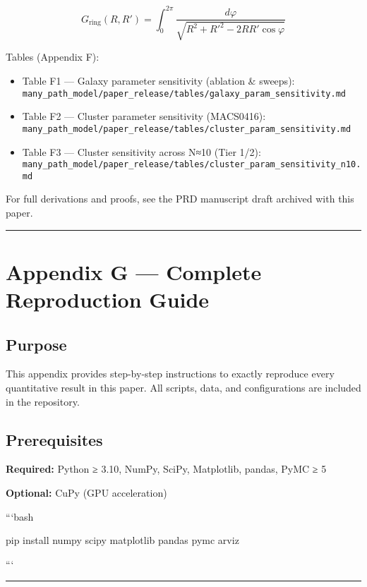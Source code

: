 \documentclass[11pt,a4paper]{article}
\begin{document}
\begin{equation}
G_{\mathrm{ring}}(R, R') = \int_{0}^{2\pi} \frac{d\varphi}{\sqrt{R^2 + R'^2 - 2 R R'\cos\varphi}}
\end{equation}


Tables (Appendix F):

\begin{itemize}
\item Table F1 — Galaxy parameter sensitivity (ablation \& sweeps): \texttt{many\_path\_model/paper\_release/tables/galaxy\_param\_sensitivity.md}
\item Table F2 — Cluster parameter sensitivity (MACS0416): \texttt{many\_path\_model/paper\_release/tables/cluster\_param\_sensitivity.md}
\item Table F3 — Cluster sensitivity across N≈10 (Tier 1/2): \texttt{many\_path\_model/paper\_release/tables/cluster\_param\_sensitivity\_n10.md}
\end{itemize}


For full derivations and proofs, see the PRD manuscript draft archived with this paper.


\medskip\hrule\medskip


\section{Appendix G — Complete Reproduction Guide}


\subsection{Purpose}


This appendix provides step-by-step instructions to exactly reproduce every quantitative result in this paper. All scripts, data, and configurations are included in the repository.


\subsection{Prerequisites}


\textbf{Required:} Python ≥ 3.10, NumPy, SciPy, Matplotlib, pandas, PyMC ≥ 5  

\textbf{Optional:} CuPy (GPU acceleration)


```bash

pip install numpy scipy matplotlib pandas pymc arviz

```


\medskip\hrule\medskip
\end{document}

